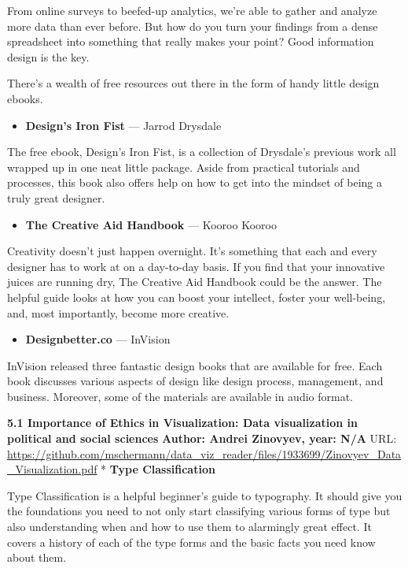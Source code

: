 \documentclass[]{book}
\providecommand{\tightlist}{%
  \setlength{\itemsep}{0pt}\setlength{\parskip}{0pt}}
\theoremstyle{definition}
\theoremstyle{definition}
\theoremstyle{definition}
\theoremstyle{remark}
\begin{document}
From online surveys to beefed-up analytics, we're able to gather and
analyze more data than ever before. But how do you turn your findings
from a dense spreadsheet into something that really makes your point?
Good information design is the key.

There's a wealth of free resources out there in the form of handy little
design ebooks.

\begin{itemize}
\tightlist
\item
  \textbf{Design's Iron Fist} --- Jarrod Drysdale
\end{itemize}

The free ebook, Design's Iron Fist, is a collection of Drysdale's
previous work all wrapped up in one neat little package. Aside from
practical tutorials and processes, this book also offers help on how to
get into the mindset of being a truly great designer.

\begin{itemize}
\tightlist
\item
  \textbf{The Creative Aid Handbook} --- Kooroo Kooroo
\end{itemize}

Creativity doesn't just happen overnight. It's something that each and
every designer has to work at on a day-to-day basis. If you find that
your innovative juices are running dry, The Creative Aid Handbook could
be the answer. The helpful guide looks at how you can boost your
intellect, foster your well-being, and, most importantly, become more
creative.

\begin{itemize}
\tightlist
\item
  \textbf{Designbetter.co} --- InVision
\end{itemize}

InVision released three fantastic design books that are available for
free. Each book discusses various aspects of design like design process,
management, and business. Moreover, some of the materials are available
in audio format.

\textbf{5.1 Importance of Ethics in Visualization: Data visualization in
political and social sciences} \textbf{Author: Andrei Zinovyev, year:
N/A} URL:
\url{https://github.com/mschermann/data_viz_reader/files/1933699/Zinovyev_Data_Visualization.pdf}
* \textbf{Type Classification}

Type Classification is a helpful beginner's guide to typography. It
should give you the foundations you need to not only start classifying
various forms of type but also understanding when and how to use them to
alarmingly great effect. It covers a history of each of the type forms
and the basic facts you need know about them.\citep{design_ebooks}
\end{document}
